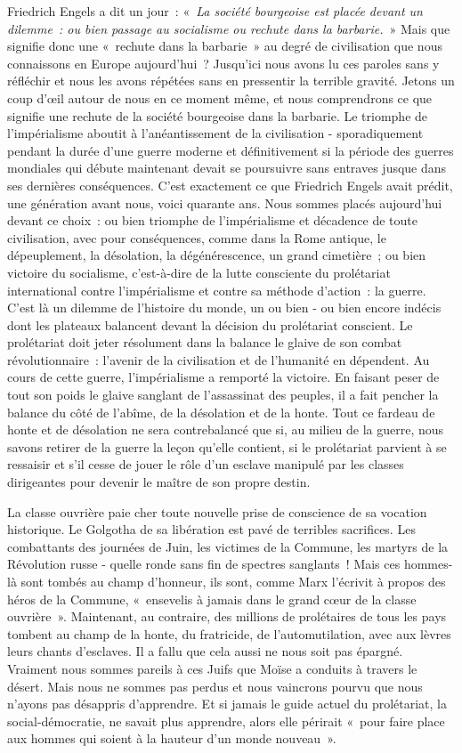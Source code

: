 \documentclass[french,twoside]{book} %
\begin{document}
Friedrich Engels a dit un jour : « \emph{La société bourgeoise est placée devant un dilemme : ou bien passage au socialisme ou rechute dans la barbarie.} » Mais que signifie donc une « rechute dans la barbarie » au degré de civilisation que nous connaissons en Europe aujourd’hui ? Jusqu’ici nous avons lu ces paroles sans y réfléchir et nous les avons répétées sans en pressentir la terrible gravité. Jetons un coup d’œil autour de nous en ce moment même, et nous comprendrons ce que signifie une rechute de la société  bourgeoise dans la barbarie. Le triomphe de l’impérialisme aboutit à l’anéantissement de la civilisation - sporadiquement pendant la durée d’une guerre moderne et définitivement si la période des guerres mondiales qui débute maintenant devait se poursuivre sans entraves jusque dans ses dernières conséquences. C'est exactement ce que Friedrich Engels avait prédit, une génération avant nous, voici quarante ans. Nous sommes placés aujourd’hui devant ce choix : ou bien triomphe de l’impérialisme et décadence de toute civilisation, avec pour conséquences, comme dans la Rome antique, le dépeuplement, la désolation, la dégénérescence, un grand cimetière ; ou bien victoire du socialisme, c’est-à-dire de la lutte consciente du prolétariat international contre l’impérialisme et contre sa méthode d’action : la guerre. C'est là un dilemme de l’histoire du monde, un ou bien - ou bien encore indécis dont les plateaux balancent devant la décision du prolétariat conscient. Le prolétariat doit jeter résolument dans la balance le glaive de son combat révolutionnaire : l’avenir de la civilisation et de l’humanité en dépendent. Au cours de cette guerre, l’impérialisme a remporté la victoire. En faisant peser de tout son poids le glaive sanglant de l’assassinat des peuples, il a fait pencher la balance du côté de l’abîme, de la désolation et de la honte. Tout ce fardeau de honte et de désolation ne sera contrebalancé que si, au milieu de la guerre, nous savons retirer de la guerre la leçon qu’elle contient, si le prolétariat parvient à se ressaisir et s’il cesse de jouer le rôle d’un esclave manipulé par les classes dirigeantes pour devenir le maître de son propre destin.\par
La classe ouvrière paie cher toute nouvelle prise de conscience de sa vocation historique. Le Golgotha de sa libération est pavé de terribles sacrifices. Les combattants des journées de Juin, les victimes de la Commune, les martyrs de la Révolution russe - quelle ronde sans fin de spectres sanglants ! Mais ces hommes-là sont tombés au champ d’honneur, ils sont, comme Marx l’écrivit à propos des héros de la Commune, « ensevelis à jamais dans le grand cœur de la classe ouvrière ». Maintenant, au contraire, des millions de prolétaires de tous les pays tombent au champ de la honte, du fratricide, de l’automutilation, avec aux lèvres leurs chants d’esclaves. Il a fallu que cela aussi ne nous soit pas épargné. Vraiment nous sommes pareils à ces Juifs que Moïse a conduits à travers le désert. Mais nous ne sommes pas perdus et nous vaincrons pourvu que nous n’ayons pas désappris d’apprendre. Et si jamais le guide actuel du prolétariat, la social-démocratie, ne savait plus apprendre, alors elle périrait « pour faire place aux hommes qui soient à la hauteur d’un monde nouveau ».
\end{document}
